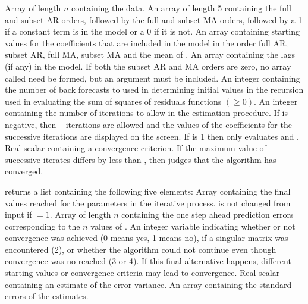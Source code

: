 \Sarg
{} Array of length $n$ containing the data.
 An array of length 5 containing the full and subset AR 
orders, followed by the full and subset MA orders, followed by a 1 if a 
constant term is in the model or a 0 if it is not.
 An array containing starting values for the coefficients 
that are included in the model in the order full AR, subset AR, full MA, 
subset MA and the mean of {}.
 An array containing the lags (if any) in the model.  If both 
the subset AR and MA orders are zero, no array called {} need 
be formed, but an argument must be included.
 An integer containing the number of back forecasts to used in 
determining initial values in the recursion used in evaluating the sum of 
squares of residuals functions $(\ge0)$.
 An integer containing the number of iterations to allow 
in the estimation procedure.  If {} is negative, then 
--{} iterations are allowed and the values of the coefficients 
for the successive iterations are displayed on the screen.  If {} 
is 1 then {} only evaluates {} and {}.
 Real scalar containing a convergence criterion.  If the 
maximum value of successive iterates differs by less than {}, 
then {} judges that the algorithm has converged.

\Sval
\Sitem{ }  returns a list containing the following 
five elements:
 Array containing the final values reached for the parameters 
in the iterative process.  {} is not changed from input if 
{}$=1$.
 Array of length $n$ containing the one step ahead prediction 
errors corresponding to the $n$ values of {}.
 An integer variable indicating whether or not convergence was
achieved (0 means yes, 1 means no), if a singular matrix was encountered 
(2), or whether the algorithm could not continue even though convergence 
was no reached (3 or 4).  If this final alternative happens, different 
starting values or convergence criteria may lead to convergence.
 Real scalar containing an estimate of the error variance.
 An array containing the standard errors of the estimates. 
%
%


